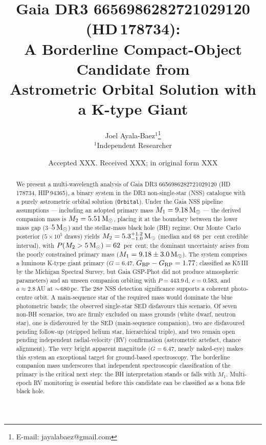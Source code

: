 \documentclass[usenatbib,fleqn]{mnras}
\title[Gaia DR3 6656986282721029120: A Borderline Compact-Object Candidate]
{Gaia DR3 6656986282721029120 (HD\,178734):\\
 A Borderline Compact-Object Candidate from\\
 Astrometric Orbital Solution with a K-type Giant}
\author[J. Ayala-Baez]{
  Joel Ayala-Baez$^{1}$\thanks{E-mail: jayalabaez@gmail.com}\\
  $^{1}$Independent Researcher
}
\date{Accepted XXX. Received XXX; in original form XXX}
\newcommand{\Msun}{{\rm M}_\odot}
\begin{document}
\label{firstpage}
\pagerange{\pageref{firstpage}--\pageref{LastPage}}
\maketitle

\begin{abstract}
We present a multi-wavelength analysis of Gaia DR3
6656986282721029120 (HD\,178734, HIP\,94365), a binary system in
the DR3 non-single-star (NSS) catalogue with a purely astrometric
orbital solution (\texttt{Orbital}).  Under the Gaia NSS pipeline
assumptions --- including an adopted primary mass
$M_1 = 9.18\,\Msun$ --- the derived companion mass is
$M_2 = 5.51\,\Msun$, placing it at the boundary between the lower
mass gap ($3$--$5\,\Msun$) and the stellar-mass black hole (BH)
regime.  Our Monte~Carlo posterior ($5 \times 10^5$ draws) yields
$M_2 = 5.3^{+1.2}_{-1.0}\,\Msun$ (median and 68~per~cent credible
interval), with $P(M_2 > 5\,\Msun) = 62$~per~cent; the dominant
uncertainty arises from the poorly constrained primary mass
($M_1 = 9.18 \pm 3.0\,\Msun$).  The system comprises a luminous
K-type giant primary ($G = 6.47$,
$G_{\rm BP} - G_{\rm RP} = 1.77$; classified as K5\,III by the
Michigan Spectral Survey, but Gaia GSP-Phot did not produce
atmospheric parameters) and an unseen companion orbiting with
$P = 443.9$\,d, $e = 0.583$, and $a \approx 2.8$\,AU at
$\sim$\,$680$\,pc.  The $28\sigma$ NSS detection significance
supports a coherent photo-centre orbit.  A main-sequence star of
the required mass would dominate the blue photometric bands; the
observed single-star SED disfavours this scenario.  Of seven
non-BH scenarios, two are firmly excluded on mass grounds (white
dwarf, neutron star), one is disfavoured by the SED
(main-sequence companion), two are disfavoured pending follow-up
(stripped helium star, hierarchical triple), and two remain open
pending independent radial-velocity (RV) confirmation (astrometric
artefact, chance alignment).  The very bright apparent magnitude
($G = 6.47$, nearly naked-eye) makes this system an exceptional
target for ground-based spectroscopy.  The borderline companion
mass underscores that independent spectroscopic classification
of the primary is the critical next step: the BH interpretation
stands or falls with $M_1$.  Multi-epoch RV monitoring is essential
before this candidate can be classified as a bona fide black hole.
\end{abstract}
\end{document}
